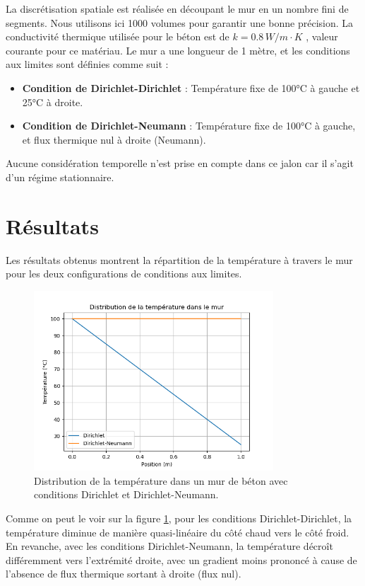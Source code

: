 \documentclass[a4paper,11pt]{article}
\begin{document}
La discrétisation spatiale est réalisée en découpant le mur en un nombre fini de segments. Nous utilisons ici 1000 volumes pour garantir une bonne précision. La conductivité thermique utilisée pour le béton est de $k = 0.8 \, W/m\cdot K$ \cite{sourceconductivity}, valeur courante pour ce matériau. Le mur a une longueur de 1 mètre, et les conditions aux limites sont définies comme suit :
\begin{itemize}
    \item \textbf{Condition de Dirichlet-Dirichlet} : Température fixe de 100°C à gauche et 25°C à droite.
    \item \textbf{Condition de Dirichlet-Neumann} : Température fixe de 100°C à gauche, et flux thermique nul à droite (Neumann).
\end{itemize}
Aucune considération temporelle n'est prise en compte dans ce jalon car il s'agit d'un régime stationnaire.

\section{Résultats}
Les résultats obtenus montrent la répartition de la température à travers le mur pour les deux configurations de conditions aux limites.

\begin{figure}[h!]
    \centering
    \includegraphics[width=0.8\textwidth]{Figure_1.png}
    \caption{Distribution de la température dans un mur de béton avec conditions Dirichlet et Dirichlet-Neumann.}
    \label{fig:temperature_distribution}
\end{figure}

Comme on peut le voir sur la figure \ref{fig:temperature_distribution}, pour les conditions Dirichlet-Dirichlet, la température diminue de manière quasi-linéaire du côté chaud vers le côté froid. En revanche, avec les conditions Dirichlet-Neumann, la température décroît différemment vers l'extrémité droite, avec un gradient moins prononcé à cause de l'absence de flux thermique sortant à droite (flux nul).
\end{document}

